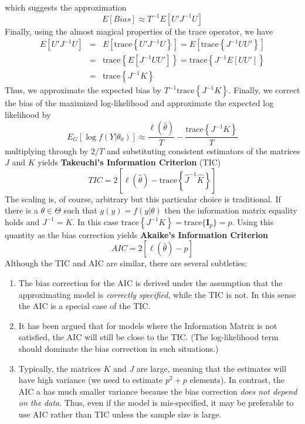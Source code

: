 \documentclass[12pt]{article}
\theoremstyle{definition}
\begin{document}
which suggests the approximation
$$E[Bias] \approx T^{-1} E[U'J^{-1}U]$$
Finally, using the almost magical properties of the trace operator, we have
\begin{eqnarray*}
E[U'J^{-1}U] &=& E\left[\mbox{trace} \left\{ U'J^{-1}U\right\} \right] = E\left[\mbox{trace} \left\{ J^{-1}UU'\right\} \right]\\
&=& \mbox{trace}\left\{ E[J^{-1}UU']\right\} = \mbox{trace}\left\{J^{-1} E[UU']\right\} \\
&=&\mbox{trace}\left\{ J^{-1} K\right\}
\end{eqnarray*}
Thus, we approximate the expected bias by $T^{-1}\mbox{trace}\left\{ J^{-1} K\right\}$. Finally, we correct the bias of the maximized log-likelihood and approximate the expected log likelihood by
$$E_G[\log f(Y|\theta_0)]\approx \frac{\ell(\widehat{\theta})}{T} - \frac{\mbox{trace}\left\{ J^{-1} K\right\}}{T}$$
multiplying through by $2/T$ and substituting consistent estimators of the matrices $J$ and $K$ yields \textbf{Takeuchi's Information Criterion} (TIC)
$$TIC = 2\left[\ell(\widehat{\theta}) - \mbox{trace}\left\{ \widehat{J}^{-1} \widehat{K}\right\} \right]$$
The scaling is, of course, arbitrary but this particular choice is traditional. If there is a $\theta \in \Theta$ such that $g(y) = f(y|\theta)$ then the information matrix equality holds and $J^{-1} = K$. In this case $\mbox{trace}\left\{ J^{-1} K\right\} = \mbox{trace}\{\mathbf{I}_p\} = p$. Using this quantity as the bias correction yields \textbf{Akaike's Information Criterion}
$$AIC = 2 \left[\ell(\widehat{\theta}) - p \right]$$
Although the TIC and AIC are similar, there are several subtleties:
\begin{enumerate}
\item The bias correction for the AIC is derived under the assumption that the approximating model is \emph{correctly specified}, while the TIC is not. In this sense the AIC is a special case of the TIC.
\item It has been argued that for models where the Information Matrix is not satisfied, the AIC will still be close to the TIC. (The log-likelihood term should dominate the bias correction in such situations.)
\item Typically, the matrices $K$ and $J$ are large, meaning that the estimates will have high variance (we need to estimate $p^2 + p$ elements). In contrast, the AIC a has much smaller variance because the bias correction \emph{does not depend on the data}. Thus, even if the model is mis-specified, it may be preferable to use AIC rather than TIC unless the sample size is large.
\end{enumerate}
\end{document}
